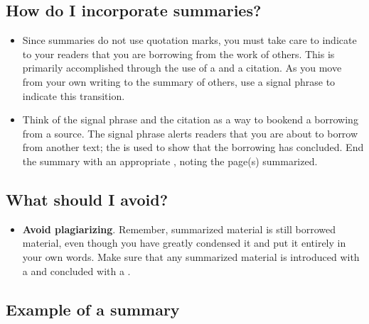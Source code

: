 \subsection{How do I incorporate summaries?}

\begin{itemize}
\item Since summaries do not use quotation marks, you must take care to
indicate to your readers that you are borrowing from the work of others. This is primarily accomplished
through the use of a \hyperlink{signalphrase}{\color{Ahrenge}{signal phrase}} and a citation. As you move from your own writing to the summary of others, use a signal phrase to indicate this transition.

\item Think of the signal phrase and the citation as a way to bookend a borrowing from a source. The signal phrase alerts readers that you are about to borrow from another text; the \hyperlink{citation}{\color{Ahrenge}{citation}} is used to show that the borrowing has concluded. End the summary with an appropriate \hyperlink{citation}{\color{Ahrenge}{citation}}, noting the page(s) summarized.
\end{itemize}

\subsection{What should I avoid?}
\begin{itemize}

\item \textbf{Avoid plagiarizing}. Remember, summarized material
is still borrowed material, even though you have greatly condensed it and
put it entirely in your own words. Make sure that any summarized material is 
introduced with a \hyperlink{signalphrase}{\color{Ahrenge}{signal phrase}} and concluded with a \hyperlink{citation}{\color{Ahrenge}{citation}}.
\end{itemize}


\subsection{Example of a summary}


